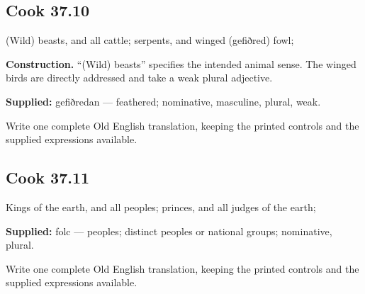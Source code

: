 \par\begin{minipage}{\linewidth}\raggedright
\subsection*{Cook 37.10}

(Wild) beasts, and all cattle; serpents, and winged (gefiðred) fowl;

\textbf{Construction.} “(Wild) beasts” specifies the intended animal sense. The winged birds are directly addressed and take a weak plural adjective.

\end{minipage}\par\addvspace{4pt}

\textbf{Supplied:} gefiðredan — feathered; nominative, masculine, plural, weak.

Write one complete Old English translation, keeping the printed controls and the supplied expressions available.

\par\begin{minipage}{\linewidth}\raggedright
\subsection*{Cook 37.11}

Kings of the earth, and all peoples; princes, and all judges of the earth;

\textbf{Supplied:} folc — peoples; distinct peoples or national groups; nominative, plural.

Write one complete Old English translation, keeping the printed controls and the supplied expressions available.

\end{minipage}\par\addvspace{4pt}

